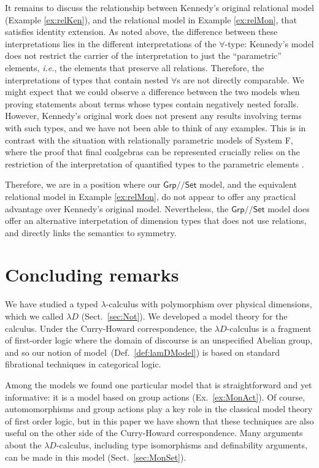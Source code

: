 \documentclass[a4paper,UKenglish]{lipics}
\newcommand{\msf}[1]{\mathsf{#1}} %
\newcommand{\Grp}{\msf{Grp}}
\newcommand{\Set}{\msf{Set}}
\newcommand{\Lslice}[1]{#1/\!/\Set}
\newcommand{\GrpSet}{\Lslice{\Grp}}
\begin{document}
It remains to discuss the relationship between Kennedy's original
relational model (Example \ref{ex:relKen}), and the relational model
in Example \ref{ex:relMon}, that satisfies identity extension. As
noted above, the difference between these interpretations lies in the
different interpretations of the $\forall$-type: Kennedy's model does
not restrict the carrier of the interpretation to just the
``parametric'' elements, \emph{i.e.}, the elements that preserve all
relations. Therefore, the interpretations of types that contain nested
$\forall$s are not directly comparable. We might expect that we could
observe a difference between the two models when proving statements
about terms whose types contain negatively nested foralls. However,
Kennedy's original work does not present any results involving terms
with such types, and we have not been able to think of any
examples. This is in contrast with the situation with relationally
parametric models of System F, where the proof that final coalgebras
can be represented crucially relies on the restriction of the
interpretation of quantified types to the parametric elements
\cite{birkedal2005categorical}.

Therefore, we are in a position where our $\GrpSet$ model, and the
equivalent relational model in Example \ref{ex:relMon}, do not appear
to offer any practical advantage over Kennedy's original
model. Nevertheless, the $\GrpSet$ model does offer an alternative
interpetation of dimension types that does not use relations, and
directly links the semantics to symmetry.

\section{Concluding remarks} \label{sec:con}
We have studied
a typed $\lambda$-calculus with polymorphism over physical dimensions,
which we called $\lambda D$ (Sect.~\ref{sec:Not}).
We developed a model theory for the calculus.
Under the Curry-Howard correspondence, the $\lambda D$-calculus is a
fragment of first-order logic where the domain of discourse is an unspecified Abelian group,
and so our notion of model~(Def.~\ref{def:lamDModel})
is based on standard fibrational techniques in categorical logic.

Among the models we found one particular model that is
straightforward and yet informative:
it is a model based on group actions (Ex.~\ref{ex:MonAct}).
Of course, automomorphisms and group actions play a key role in the
classical model theory of first order logic, but in this paper we have shown that
these techniques are also useful on the other side of the Curry-Howard correspondence.
Many arguments about the $\lambda D$-calculus,
including type isomorphisms and definability arguments, can be made in this model
(Sect.~\ref{sec:MonSet}).
\end{document}
